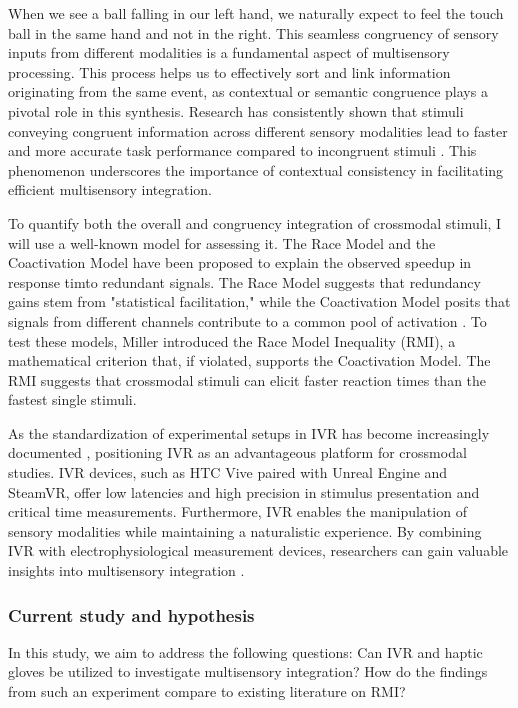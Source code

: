 \documentclass[12pt,oneside,openright]{report}
\begin{document}
When we see a ball falling in our left hand, we naturally expect to feel the touch ball in the same hand and not in the right. This seamless congruency of sensory inputs from different modalities is a fundamental aspect of multisensory processing. This process helps us to effectively sort and link information originating from the same event, as contextual or semantic congruence plays a pivotal role in this synthesis. Research has consistently shown that stimuli conveying congruent information across different sensory modalities lead to faster and more accurate task performance compared to incongruent stimuli \parencite{Laurienti2003CrossmodalSP}. This phenomenon underscores the importance of contextual consistency in facilitating efficient multisensory integration. 

To quantify both the overall and congruency integration of crossmodal stimuli, I will use a well-known model for assessing it. The Race Model and the Coactivation Model have been proposed to explain the observed speedup in response timto redundant signals. The Race Model suggests that redundancy gains stem from "statistical facilitation," while the Coactivation Model posits that signals from different channels contribute to a common pool of activation \parencite{MILLER1982247}. To test these models, Miller introduced the Race Model Inequality (RMI), a mathematical criterion that, if violated, supports the Coactivation Model. The RMI suggests that crossmodal stimuli can elicit faster reaction times than the fastest single stimuli.

As the standardization of experimental setups in IVR has become increasingly documented \parencite{Vasser2020GuidelinesFI,deGelder2018VirtualRA, Schne2023TheRO,vr_respont}, positioning IVR as an advantageous platform for crossmodal studies. IVR devices, such as HTC Vive paired with Unreal Engine and SteamVR, offer low latencies and high precision in stimulus presentation and critical time measurements. Furthermore, IVR enables the manipulation of sensory modalities while maintaining a naturalistic experience. By combining IVR with electrophysiological measurement devices, researchers can gain valuable insights into multisensory integration \parencite{Vasser2020GuidelinesFI}.

\subsubsection*{Current study and hypothesis}

In this study, we aim to address the following questions: Can IVR and haptic gloves be utilized to investigate multisensory integration? How do the findings from such an experiment compare to existing literature on RMI?
\end{document}
